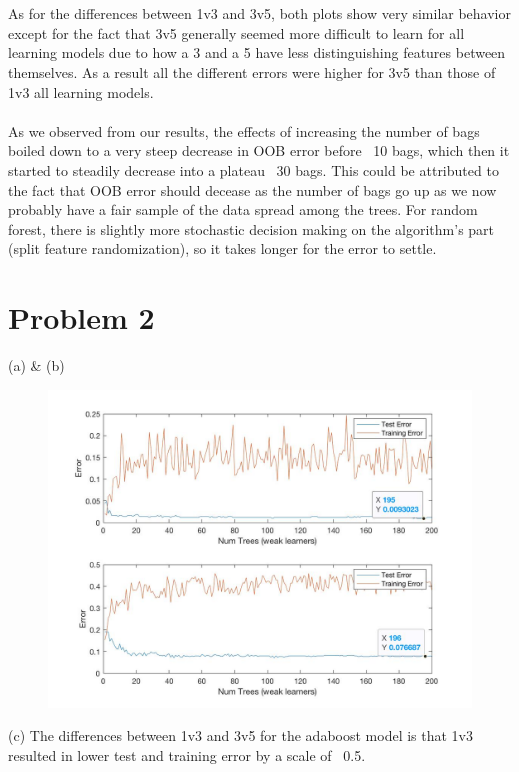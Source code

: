 \documentclass[12pt,letterpaper]{article}
\begin{document}
\begin{description}
	\\\\As for the differences between 1v3 and 3v5, both plots show very similar behavior except for the fact that 3v5 generally seemed more difficult to learn for all learning models due to how a 3 and a 5 have less distinguishing features between themselves. As a result all the different errors were higher for 3v5 than those of 1v3 all learning models.
	\\\\As we observed from our results, the effects of increasing the number of bags boiled down to a very steep decrease in OOB error before ~10 bags, which then it started to steadily decrease into a plateau ~30 bags. This could be attributed to the fact that OOB error should decease as the number of bags go up as we now probably have a fair sample of the data spread among the trees. For random forest, there is slightly more stochastic decision making on the algorithm's part (split feature randomization), so it takes longer for the error to settle.

\end{description}
\section*{Problem 2}
\begin{description}
	\item (a) \& (b)
\begin{figure}[H]
\includegraphics[scale=0.4]{image2.jpg} 
\end{figure}
	\item (c) The differences between 1v3 and 3v5 for the adaboost model is that 1v3 resulted in lower test and training error by a scale of ~0.5.

\end{description}
\end{document}

